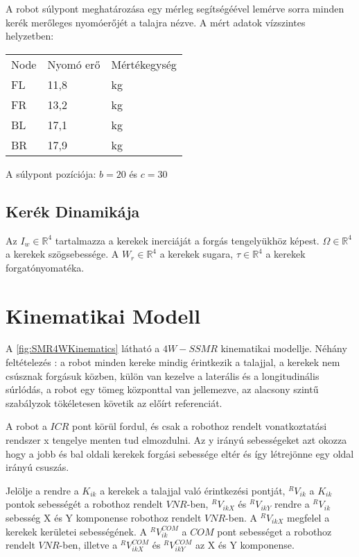 A robot súlypont meghatározása egy mérleg segítségéével lemérve sorra minden kerék merőleges nyomóerőjét a talajra nézve. 
A mért adatok vízszintes helyzetben:

\begin{table}[H]
\center
\begin{tabular}{lll}
Node  & Nyomó erő & Mértékegység \\
FL &   11,8      & kg          \\
FR &   13,2      & kg          \\
BL &   17,1      & kg          \\
BR &   17,9      & kg            
\end{tabular}
\end{table}

A súlypont pozíciója: $b = 20$ és $c = 30 $

\subsection{Kerék Dinamikája}
Az $I_w \in \mathbb{R}^4$ tartalmazza a kerekek inerciáját a forgás tengelyükhöz képest. $\Omega \in \mathbb{R}^4$ a kerekek szögsebessége. A $W_r \in \mathbb{R}^4$ a kerekek sugara, $\tau \in \mathbb{R}^4$ a kerekek forgatónyomatéka.




\section{Kinematikai Modell} 

A \ref{fig:SMR4WKinematics} látható a $4W-SSMR$ kinematikai modellje. Néhány feltételezés : a robot minden kereke mindig érintkezik a talajjal, a kerekek nem csúsznak forgásuk közben, külön van kezelve a laterális és a longitudinális súrlódás, a robot egy tömeg központtal van jellemezve, az alacsony szintű szabályzok tökéletesen követik az előírt referenciát.

A robot a $ICR$ pont körül fordul, és csak a robothoz rendelt vonatkoztatási rendszer x tengelye menten tud elmozdulni. Az y irányú sebességeket azt okozza hogy a jobb és bal oldali kerekek forgási sebessége eltér és így létrejönne egy oldal irányú csuszás. 

Jelölje a rendre a $K_{ik}$ a kerekek a talajjal való érintkezési pontját, $^RV_{ik}$ a $K_{ik}$ pontok sebességét a robothoz rendelt $VNR$-ben, $^RV_{ikX}$ és $^RV_{ikY}$ rendre a $^RV_{ik}$ sebesség X és Y komponense robothoz rendelt $VNR$-ben. A $^RV_{ikX}$ megfelel a kerekek kerületei sebességének. A $^RV^{COM}_{ik}$ a $COM$ pont sebességet a robothoz rendelt $VNR$-ben, illetve a $^RV^{COM}_{ikX}$ és $^RV^{COM}_{ikY}$ az X és Y komponense. 

